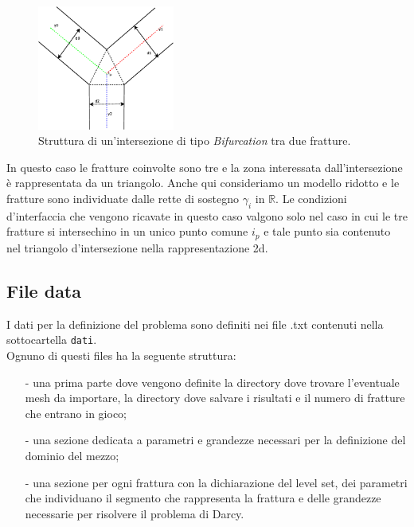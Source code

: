 \begin{figure}[htbp]
\begin{center}
\includegraphics[width=0.4\textwidth]{img/cap2/bifurcation.eps}
\caption{Struttura di un'intersezione di tipo \textit{Bifurcation} tra due fratture.}\label{Bifurcation}
\end{center}
\end{figure}

\noindent In questo caso le fratture coinvolte sono tre e la zona interessata dall'intersezione è rappresentata da un triangolo. Anche qui consideriamo un modello ridotto e le fratture sono individuate dalle rette di sostegno $\gamma_i$ in $\mathbb{R}$. Le condizioni d'interfaccia che vengono ricavate in questo caso valgono solo nel caso in cui le tre fratture si intersechino in un unico punto comune $i_p$ e tale punto sia contenuto nel triangolo d'intersezione nella rappresentazione 2d.

\subsection{File data}

I dati per la definizione del problema sono definiti nei file .txt contenuti nella sottocartella \texttt{dati}. \\
\noindent Ognuno di questi files ha la seguente struttura:

\begin{enumerate}
\item[-] una prima parte dove vengono definite la directory dove trovare l'eventuale mesh da importare, la directory dove salvare i risultati e il numero di fratture che entrano in gioco;
\item[-] una sezione dedicata a parametri e grandezze necessari per la definizione del dominio del mezzo;
\item[-] una sezione per ogni frattura con la dichiarazione del level set, dei parametri che individuano il segmento che rappresenta la frattura e delle grandezze necessarie per risolvere il problema di Darcy.
\end{enumerate}

